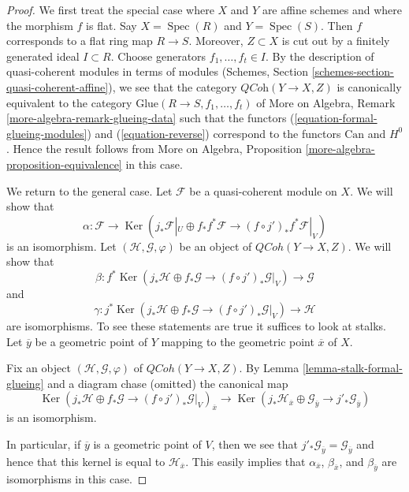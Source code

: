 \documentclass[10pt,a4paper]{amsart}
\theoremstyle{plain}
\theoremstyle{definition}
\theoremstyle{remark}
\numberwithin{equation}{subsection}
\def\Spec{\mathop{\mathrm{Spec}}}
\def\QCoh{\mathit{QCoh}}
\def\Ker{\mathop{\mathrm{Ker}}}
\begin{document}
\begin{proof}
We first treat the special case where $X$ and $Y$ are affine schemes
and where the morphism $f$ is flat. Say $X = \Spec(R)$ and $Y = \Spec(S)$.
Then $f$ corresponds to a flat ring map $R \to S$. Moreover, $Z \subset X$
is cut out by a finitely generated ideal $I \subset R$. Choose generators
$f_1, \ldots, f_t \in I$. By the description of quasi-coherent modules
in terms of modules
(Schemes, Section \ref{schemes-section-quasi-coherent-affine}),
we see that the category $\textit{QCoh}(Y \to X, Z)$
is canonically equivalent to the category
$\text{Glue}(R \to S, f_1, \ldots, f_t)$
of More on Algebra, Remark \ref{more-algebra-remark-glueing-data}
such that the functors
(\ref{equation-formal-glueing-modules}) and (\ref{equation-reverse})
correspond to the functors $\text{Can}$ and $H^0$.
Hence the result follows from
More on Algebra, Proposition \ref{more-algebra-proposition-equivalence}
in this case.

\medskip\noindent
We return to the general case.
Let $\mathcal{F}$ be a quasi-coherent module on $X$.
We will show that
$$
\alpha :
\mathcal{F}
\longrightarrow
\Ker\left(j_*\mathcal{F}|_U \oplus f_*f^*\mathcal{F} \to
(f \circ j')_*f^*\mathcal{F}|_V\right)
$$
is an isomorphism. Let $(\mathcal{H}, \mathcal{G}, \varphi)$
be an object of $\QCoh(Y \to X, Z)$. We will show that
$$
\beta :
f^*\Ker\left(
j_*\mathcal{H} \oplus f_*\mathcal{G} \to (f \circ j')_*\mathcal{G}|_V
\right)
\longrightarrow
\mathcal{G}
$$
and
$$
\gamma :
j^*\Ker\left(
j_*\mathcal{H} \oplus f_*\mathcal{G} \to (f \circ j')_*\mathcal{G}|_V
\right)
\longrightarrow
\mathcal{H}
$$
are isomorphisms. To see these statements are true it suffices to
look at stalks. Let $\overline{y}$ be a geometric point of $Y$ mapping
to the geometric point $\overline{x}$ of $X$.

\medskip\noindent
Fix an object $(\mathcal{H}, \mathcal{G}, \varphi)$ of $\QCoh(Y \to X, Z)$.
By Lemma \ref{lemma-stalk-formal-glueing}
and a diagram chase (omitted) the canonical map
$$
\Ker(j_*\mathcal{H} \oplus f_*\mathcal{G} \to
(f \circ j')_*\mathcal{G}|_V)_{\overline{x}}
\longrightarrow
\Ker(
j_*\mathcal{H}_{\overline{x}} \oplus \mathcal{G}_{\overline{y}}
\to
j'_*\mathcal{G}_{\overline{y}}
)
$$
is an isomorphism.

\medskip\noindent
In particular, if $\overline{y}$ is a geometric point of $V$, then
we see that $j'_*\mathcal{G}_{\overline{y}} = \mathcal{G}_{\overline{y}}$
and hence that this kernel is equal to $\mathcal{H}_{\overline{x}}$.
This easily implies that $\alpha_{\overline{x}}$, $\beta_{\overline{x}}$,
and $\beta_{\overline{y}}$ are isomorphisms in this case.


\end{proof}
\end{document}
